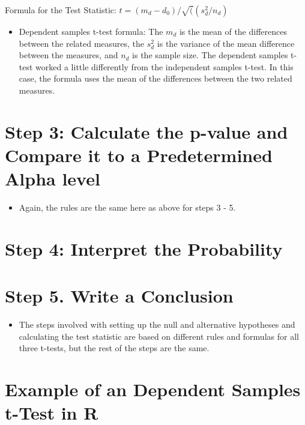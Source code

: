 \documentclass[
  letterpaper,
  DIV=11,
  numbers=noendperiod]{scrreprt}
\providecommand{\tightlist}{%
  \setlength{\itemsep}{0pt}\setlength{\parskip}{0pt}}\usepackage{longtable,booktabs,array}
\begin{document}
Formula for the Test Statistic: \(t = (m_d-d_0)/\sqrt((s^2_d/n_d)\)

\begin{itemize}
\tightlist
\item
  Dependent samples t-test formula: The \(m_d\) is the mean of the
  differences between the related measures, the \(s^2_d\) is the
  variance of the mean difference between the measures, and \(n_d\) is
  the sample size. The dependent samples t-test worked a little
  differently from the independent samples t-test. In this case, the
  formula uses the mean of the differences between the two related
  measures.
\end{itemize}

\section{Step 3: Calculate the p-value and Compare it to a Predetermined
Alpha
level}\label{step-3-calculate-the-p-value-and-compare-it-to-a-predetermined-alpha-level-1}

\begin{itemize}
\tightlist
\item
  Again, the rules are the same here as above for steps 3 - 5.
\end{itemize}

\section{Step 4: Interpret the
Probability}\label{step-4-interpret-the-probability-1}

\section{Step 5. Write a Conclusion}\label{step-5.-write-a-conclusion}

\begin{itemize}
\tightlist
\item
  The steps involved with setting up the null and alternative hypotheses
  and calculating the test statistic are based on different rules and
  formulas for all three t-tests, but the rest of the steps are the
  same.
\end{itemize}

\section{Example of an Dependent Samples t-Test in
R}\label{example-of-an-dependent-samples-t-test-in-r}
\end{document}
